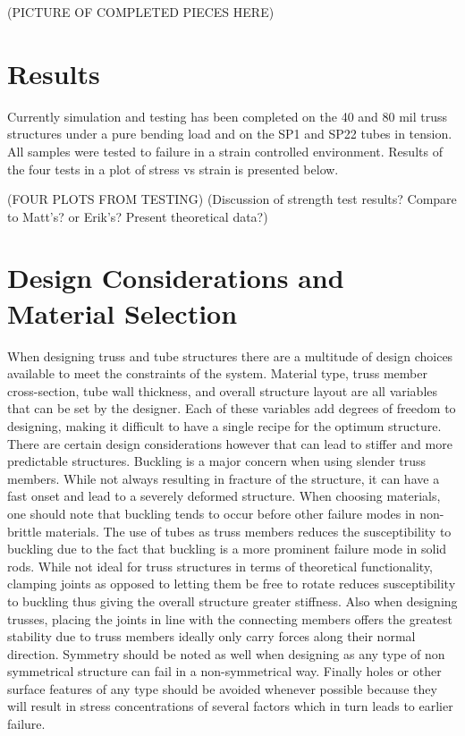 \documentclass[final]{svjour2}
\begin{document}
(PICTURE OF COMPLETED PIECES HERE)

\section{Results}
Currently simulation and testing has been completed on the 40 and 80 mil truss structures under a pure bending load and on the SP1 and SP22 tubes in tension.  All samples were tested to failure in a strain controlled environment.  Results of the four tests in a plot of stress vs strain is presented below.

(FOUR PLOTS FROM TESTING)
(Discussion of strength test results? Compare to Matt's? or Erik's? Present theoretical data?)

\section{Design Considerations and Material Selection}
When designing truss and tube structures there are a multitude of design choices available to meet the constraints of the system.  Material type, truss member cross-section, tube wall thickness, and overall structure layout are all variables that can be set by the designer.  Each of these variables add degrees of freedom to designing, making it difficult to have a single recipe for the optimum structure.  There are certain design considerations however that can lead to stiffer and more predictable structures.  Buckling is a major concern when using slender truss members.  While not always resulting in fracture of the structure, it can have a fast onset and lead to a severely deformed structure.  When choosing materials, one should note that buckling tends to occur before other failure modes in non-brittle materials. The use of tubes as truss members reduces the susceptibility to buckling due to the fact that buckling is a more prominent failure mode in solid rods.  While not ideal for truss structures in terms of theoretical functionality, clamping joints as opposed to letting them be free to rotate reduces susceptibility to buckling thus giving the overall structure greater stiffness. Also when designing trusses, placing the joints in line with the connecting members offers the greatest stability due to truss members ideally only carry forces along their normal direction.  Symmetry should be noted as well when designing as any type of non symmetrical structure can fail in a non-symmetrical way.  Finally holes or other surface features of any type should be avoided whenever possible because they will result in stress concentrations of several factors which in turn leads to earlier failure.  
\end{document}
